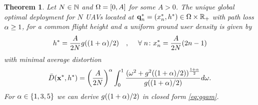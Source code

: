 \documentclass[smallabstract,smallcaptions]{dccpaper}
\newtheorem{theorem}{Theorem}
\newif\ifproof\prooffalse %
\newcommand{\Dis}{\ensuremath{D}}                    %
\newcommand{\AvDis}{\ensuremath{\bar{\Dis}}}         %
\newcommand{\philippstart}{\color{black}}
\begin{document}
\newcommand{\pGlob}{\ensuremath{x^{*}}}
\newcommand{\hGlob}{\ensuremath{h^{*}}}
\newcommand{\qGlob}{\ensuremath{{\mathbf q}^{*}}}
\newcommand{\qLoc}{\ensuremath{{\mathbf q}^{*}}}
%
%
\philippstart
%
\begin{theorem}\label{thm:commonheight}
  Let $N\in{\ensuremath{\mathbb N}}$ and $\Omega=[0,A]$ for some $A> 0$. The \emph{unique global optimal deployment} for $N$ UAVs located  at
   $\qLoc_n=(x_n^{*},h^{*})\in \Ome\times
  \R_+$ with path loss $\alpha\geq 1$, for a common flight height and a uniform ground user density is given
  by   
   \begin{align}
     h^*= \frac{A}{2N} g((1+\alp)/2)\quad,\quad\forall n \colon \pGlob_n= \frac{A}{2N} (2n-1)\label{eq:optimaldeploy} 
  \end{align}
  with minimal average distortion
  \begin{align}
    \AvDis(\vx^*,h^*)=\left(\frac{A}{2N}\right)^{\alp}  \int_0^1
    \frac{(\ome^2+g^2( (1+\alp)/2))^{\frac{1+\alp}{2}}}{g( (1+\alp)/2)}
    d\ome\label{eq:optimumavpow}.
  \end{align}
  For $\alpha\in\{1,3,5\}$ we can derive $g((1+\alpha)/2)$ in closed form  \eqref{eq:ggam}.
\end{theorem}
%
\ifproof 
\end{document}
